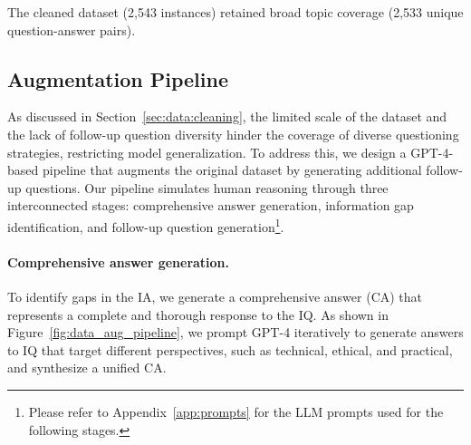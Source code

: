 


The cleaned dataset (2,543 instances) retained broad topic coverage (2,533 unique question-answer pairs).

\subsection{Augmentation Pipeline}
\label{sec:data:augmentation}

As discussed in Section~\ref{sec:data:cleaning}, the limited scale of the dataset and the lack of follow-up question diversity hinder the coverage of diverse questioning strategies, restricting model generalization. To address this, we design a GPT-4-based pipeline that augments the original dataset by generating additional follow-up questions. Our pipeline simulates human reasoning through three interconnected stages: comprehensive answer generation, information gap identification, and follow-up question generation\footnote{Please refer to Appendix~\ref{app:prompts} for the LLM prompts used for the following stages.}. %

\paragraph{Comprehensive answer generation.} To identify gaps in the IA, we generate a comprehensive answer (CA) that represents a complete and thorough response to the IQ. As shown in Figure~\ref{fig:data_aug_pipeline}, we prompt GPT-4 iteratively to generate answers to IQ that target different perspectives, such as technical, ethical, and practical, and synthesize a unified CA.

